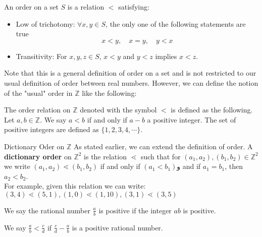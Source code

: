 \begin{definition}
	An order on a set $ S $ is a relation $ < $ satisfying:
	\begin{itemize}
		\item Low of trichotomy: $ \forall x,y \in S $, the only one of the following statements are true
		\[ x<y, \quad x=y, \quad y<x \]
		
		\item Transitivity: For $ x,y,z \in S $, $ x<y $ and $ y<z $ implies $ x<z $.
	\end{itemize}
\end{definition}


Note that this is a general definition of order on a set and is not restricted to our usual definition of order between real numbers. However, we can define the notion of the "usual" order in $ \mathbb{Z} $ like the following:

\begin{definition}
	The order relation on $ \mathbb{Z} $ denoted with the symbol $ < $ is defined as the following. Let $ a,b \in \mathbb{Z} $. We say $ a<b $ if and only if $ a-b $ a positive integer. The set of positive integers are defined as $ \{ 1,2,3,4,\cdots \} $.
\end{definition}

\begin{example}{Dictionary Oder on $\mathbb{Z}$}
	As stated earlier, we can extend the definition of order. A \textbf{dictionary order} on $\mathbb{Z}^2$ is the relation $\lessdot$ such that for $(a_1, a_2), (b_1,b_2) \in \mathbb{Z}^2$ we write $(a_1, a_2) \lessdot (b_1, b_2)$ if and only if  $(a_1 < b_1) $و and if $a_1 = b_1$, then $ a_2 < b_2 $. \\
	For example, given this relation we can write:
	$(3,4) \lessdot (5,1), (1,0) \lessdot (1,10), (3,1) \lessdot (3,5)$
\end{example}



\begin{definition}
	We say the rational number $ \frac{a}{b} $ is positive if the integer $ ab $ is positive. 
\end{definition}

\begin{definition}
	We say $ \frac{a}{b} < \frac{c}{d}$ if $ \frac{c}{d} - \frac{a}{b} $ is a positive rational number.
\end{definition}

